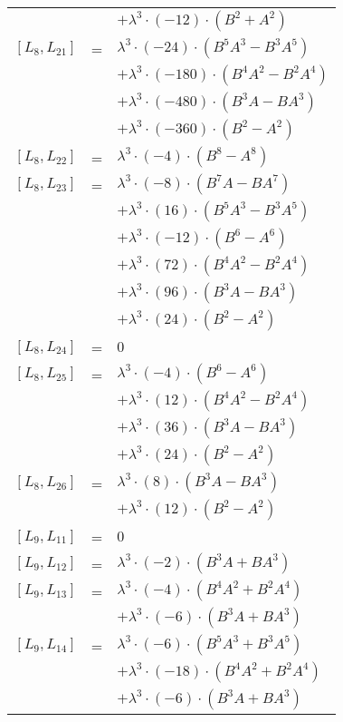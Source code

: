 \documentclass{article}
\begin{document}
\begin{center}
\begin{longtable}{lll}
 & & $ + {\lambda}^3{\cdot}(-12){\cdot}(B^{2}+A^{2})$ \\
$[L_{8},L_{21}]$ & = & ${\lambda}^3{\cdot}(-24){\cdot}(B^{5}A^{3}-B^{3}A^{5})$ \\*
 & & $ + {\lambda}^3{\cdot}(-180){\cdot}(B^{4}A^{2}-B^{2}A^{4})$ \\*
 & & $ + {\lambda}^3{\cdot}(-480){\cdot}(B^{3}A-BA^{3})$ \\*
 & & $ + {\lambda}^3{\cdot}(-360){\cdot}(B^{2}-A^{2})$ \\
$[L_{8},L_{22}]$ & = & ${\lambda}^3{\cdot}(-4){\cdot}(B^{8}-A^{8})$ \\
$[L_{8},L_{23}]$ & = & ${\lambda}^3{\cdot}(-8){\cdot}(B^{7}A-BA^{7})$ \\*
 & & $ + {\lambda}^3{\cdot}(16){\cdot}(B^{5}A^{3}-B^{3}A^{5})$ \\*
 & & $ + {\lambda}^3{\cdot}(-12){\cdot}(B^{6}-A^{6})$ \\*
 & & $ + {\lambda}^3{\cdot}(72){\cdot}(B^{4}A^{2}-B^{2}A^{4})$ \\*
 & & $ + {\lambda}^3{\cdot}(96){\cdot}(B^{3}A-BA^{3})$ \\*
 & & $ + {\lambda}^3{\cdot}(24){\cdot}(B^{2}-A^{2})$ \\
$[L_{8},L_{24}]$ & = & $ 0 $ \\
$[L_{8},L_{25}]$ & = & ${\lambda}^3{\cdot}(-4){\cdot}(B^{6}-A^{6})$ \\*
 & & $ + {\lambda}^3{\cdot}(12){\cdot}(B^{4}A^{2}-B^{2}A^{4})$ \\*
 & & $ + {\lambda}^3{\cdot}(36){\cdot}(B^{3}A-BA^{3})$ \\*
 & & $ + {\lambda}^3{\cdot}(24){\cdot}(B^{2}-A^{2})$ \\
$[L_{8},L_{26}]$ & = & ${\lambda}^3{\cdot}(8){\cdot}(B^{3}A-BA^{3})$ \\*
 & & $ + {\lambda}^3{\cdot}(12){\cdot}(B^{2}-A^{2})$ \\
$[L_{9},L_{11}]$ & = & $ 0 $ \\
$[L_{9},L_{12}]$ & = & ${\lambda}^3{\cdot}(-2){\cdot}(B^{3}A+BA^{3})$ \\
$[L_{9},L_{13}]$ & = & ${\lambda}^3{\cdot}(-4){\cdot}(B^{4}A^{2}+B^{2}A^{4})$ \\*
 & & $ + {\lambda}^3{\cdot}(-6){\cdot}(B^{3}A+BA^{3})$ \\
$[L_{9},L_{14}]$ & = & ${\lambda}^3{\cdot}(-6){\cdot}(B^{5}A^{3}+B^{3}A^{5})$ \\*
 & & $ + {\lambda}^3{\cdot}(-18){\cdot}(B^{4}A^{2}+B^{2}A^{4})$ \\*
 & & $ + {\lambda}^3{\cdot}(-6){\cdot}(B^{3}A+BA^{3})$ \\

\end{longtable}
\end{center}
\end{document}
